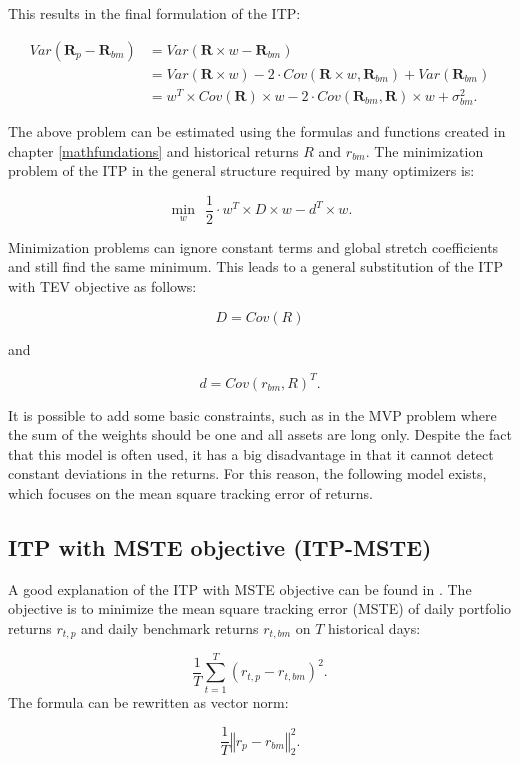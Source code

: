 \documentclass[
  oneside, a4paper, 12pt, openany]{book}
\theoremstyle{definition}
\theoremstyle{definition}
\theoremstyle{definition}
\theoremstyle{definition}
\theoremstyle{remark}
\begin{document}
This results in the final formulation of the ITP:

\begin{align*}
  Var(\pmb{R}_{p}-\pmb{R}_{bm}) & = Var(\pmb{R} \times w - \pmb{R}_{bm}) \\
  & = Var(\pmb{R} \times w) - 2 \cdot Cov(\pmb{R} \times w,\pmb{R}_{bm}) + Var(\pmb{R}_{bm})  \\
  & = w^T \times Cov(\pmb{R}) \times w - 2 \cdot Cov(\pmb{R}_{bm}, \pmb{R}) \times w + \sigma_{bm}^2.
  \label{eq:ITP}
\end{align*}

The above problem can be estimated using the formulas and functions created in chapter \ref{mathfundations} and historical returns \(R\) and \(r_{bm}\). The minimization problem of the ITP in the general structure required by many optimizers is:

\[
  \min\limits_{w} \ \ \frac{1}{2} \cdot w^T \times D \times w -d^T \times w.
\]

Minimization problems can ignore constant terms and global stretch coefficients and still find the same minimum. This leads to a general substitution of the ITP with TEV objective as follows:

\[
  D = Cov(R)
\]

and

\[
d = Cov(r_{bm}, R)^T.
\]

It is possible to add some basic constraints, such as in the MVP problem where the sum of the weights should be one and all assets are long only. Despite the fact that this model is often used, it has a big disadvantage in that it cannot detect constant deviations in the returns. For this reason, the following model exists, which focuses on the mean square tracking error of returns.

\hypertarget{ITPMSTE}{%
\subsection{ITP with MSTE objective (ITP-MSTE)}\label{ITPMSTE}}

A good explanation of the ITP with MSTE objective can be found in \citep{AhBa2017}. The objective is to minimize the mean square tracking error (MSTE) of daily portfolio returns \(r_{t, p}\) and daily benchmark returns \(r_{t, bm}\) on \(T\) historical days:

\[
  \frac{1}{T} \sum^T_{t=1}(r_{t, p}-r_{t, bm})^2.
\]
The formula can be rewritten as vector norm:

\[
  \frac{1}{T} \left\Vert r_{p}-r_{bm} \right\Vert_2^2.
\]
\end{document}

